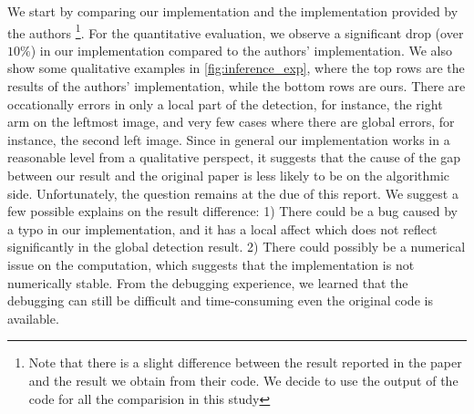\documentclass[10pt,twocolumn,letterpaper]{article}
\begin{document}
We start by comparing our implementation and the implementation provided by the authors \footnote{Note that there is a slight difference between the result reported in the paper and the result we obtain from their code. We decide to use the output of the code for all the comparision in this study}. For the quantitative evaluation, we observe a significant drop (over $10\%$) in our implementation compared to the authors' implementation. We also show some qualitative examples in \ref{fig:inference_exp}, where the top rows are the results of the authors' implementation, while the bottom rows are ours. There are occationally errors in only a local part of the detection, for instance, the right arm on the leftmost image, and very few cases where there are global errors, for instance, the second left image. Since in general our implementation works in a reasonable level from a qualitative perspect, it suggests that the cause of the gap between our result and the original paper is less likely to be on the algorithmic side. Unfortunately, the question remains at the due of this report. We suggest a few possible explains on the result difference: 1) There could be a bug caused by a typo in our implementation, and it has a local affect which does not reflect significantly in the global detection result. 2) There could possibly be a numerical issue on the computation, which suggests that the implementation is not numerically stable. From the debugging experience, we learned that the debugging can still be difficult and time-consuming even the original code is available.

\end{document}
